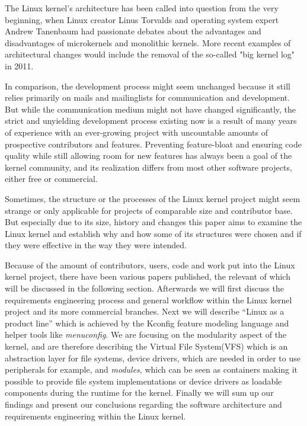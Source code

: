 \documentclass{sig-alternate-05-2015}
\begin{document}
The Linux kernel's architecture has been called into question from the very beginning, when Linux creator Linus Torvalds and operating system expert Andrew Tanenbaum had passionate debates about the advantages and disadvantages of microkernels and monolithic kernels.
More recent examples of architectural changes would include the removal of the so-called "big kernel log" in 2011.

In comparison, the development process might seem unchanged because it still relies primarily on mails and mailinglists for communication and development.
But while the communication medium might not have changed significantly, the strict and unyielding development process existing now is a result of many years of experience with an ever-growing project with uncountable amounts of prospective contributors and features.
Preventing feature-bloat and ensuring code quality while still allowing room for new features has always been a goal of the kernel community, and its realization differs from most other software projects, either free or commercial.


Sometimes, the structure or the processes of the Linux kernel project might seem strange or only applicable for projects of comparable size and contributor base.
But especially due to its size, history and changes this paper aims to examine the Linux kernel and establish why and how some of its structures were chosen and if they were effective in the way they were intended.


Because of the amount of contributors, users, code and work put into the Linux kernel project, there have been various papers published, the relevant of which will be discussed in the following section.
Afterwards we will first discuss the requirements engineering process and general workflow within the Linux kernel project and its more commercial branches.
Next we  will describe ``Linux as a product line'' which is achieved by the Kconfig feature modeling language and helper tools like \emph{menuconfig}. We are focusing on the modularity aspect of the kernel, and are therefore describing the Virtual File System(VFS) which is an abstraction layer for file systems, device drivers, which are needed in order to use peripherals for example, and \emph{modules}, which can be seen as containers making it possible to provide file system implementations or device drivers as loadable components during the runtime for the kernel. 
Finally we will sum up our findings and present our conclusions regarding the software architecture and requirements engineering within the Linux kernel.
\end{document}
